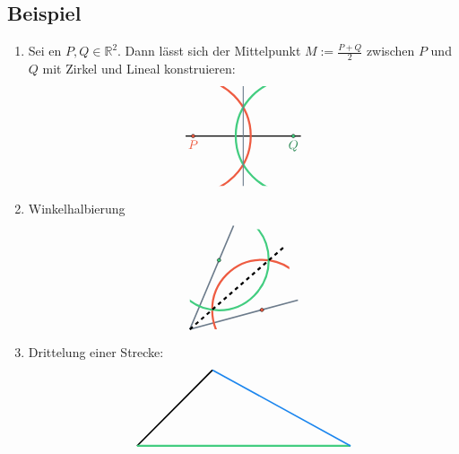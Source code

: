 \subsection[Beispiel: Mögliche Konstruktionen mit Zirkel und Lineal]{Beispiel} %
\label{sub:101}
\begin{enumerate}[1)]
	\item Sei en $P,Q \in \mathds{R}^2$. Dann lässt sich der Mittelpunkt $M := \frac{P+Q}{2} $ zwischen $P$ und $Q$ mit Zirkel und Lineal konstruieren:
	\[
		\begin{tikzpicture}[scale=0.7]
			\coordinate (A) at (0,2);
			\coordinate (B) at (4,2);
			\draw[thick] (-0.3,2) -- (4.3,2);
			\draw[fill=Tomato2] (A) circle[radius=0.07];
			\node[color=Tomato2, below] at (A) {$P$};
			\draw[fill=SeaGreen3] (B) circle[radius=0.07];
			\node[color=SeaGreen4, below] at (B) {$Q$};
			\begin{scope}
			  \clip(1,0)--(3,0)--(3,4) -- (1,4);
			  \draw[color=Tomato2, ultra thick] (A) circle[radius=2.3];
			  \draw[color=SeaGreen3, ultra thick] (B) circle[radius=2.3];
			\end{scope}
			\draw[thick, color=SlateGray4] (2,0) -- (2,4);
		\end{tikzpicture}
	\]
	\item Winkelhalbierung
	\[
		\begin{tikzpicture}[scale=0.7]
			\coordinate (O) at (0,0);
			\coordinate (A) at (15:3);
			\coordinate (B) at (67:3);
			\draw[color=SlateGray4, very thick] (O) -- (A) -- ++ (15:1.5);
			\draw[color=SlateGray4, very thick] (O) -- (B) -- ++ (67:1.5);
			\begin{scope}
			  \clip(0,0)--(4,0)--(4,4) -- (0,4);
			  \draw[color=Tomato2, ultra thick] (A) circle[radius=2];
			  \draw[color=SeaGreen3, ultra thick] (B) circle[radius=2];
			\end{scope}
			\draw[fill=Tomato2] (A) circle[radius=0.07cm];
			\draw[fill=SeaGreen3] (B) circle[radius=0.07cm];
			\draw[dashed, ultra thick] (0,0) -- (41:5);
		\end{tikzpicture}
	\]
	\item Drittelung einer Strecke:
	\[
		\begin{tikzpicture}
			\coordinate (A) at (45:1);
			\coordinate (B) at (45:2);
			\coordinate (C) at (45:3);
			\draw[very thick] (0,0) -- (C);
			\draw[ultra thick, color=SeaGreen3] (0,0) -- (6,0);
			\draw[color=DodgerBlue2, very thick] (C) -- (6,0);

\end{tikzpicture}\]
\end{enumerate}
